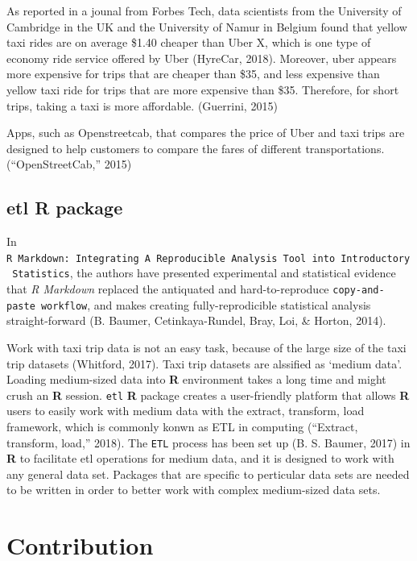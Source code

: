 \documentclass[12pt,twoside]{reedthesis}
\theoremstyle{definition}
\theoremstyle{definition}
\theoremstyle{definition}
\theoremstyle{remark}
\begin{document}
As reported in a jounal from Forbes Tech, data scientists from the
University of Cambridge in the UK and the University of Namur in Belgium
found that yellow taxi rides are on average \$1.40 cheaper than Uber X,
which is one type of economy ride service offered by Uber (HyreCar,
2018). Moreover, uber appears more expensive for trips that are cheaper
than \$35, and less expensive than yellow taxi ride for trips that are
more expensive than \$35. Therefore, for short trips, taking a taxi is
more affordable. (Guerrini, 2015)

Apps, such as Openstreetcab, that compares the price of Uber and taxi
trips are designed to help customers to compare the fares of different
transportations. (``OpenStreetCab,'' 2015)

\subsection{etl R package}\label{etl-r-package}

In
\texttt{R\ Markdown:\ Integrating\ A\ Reproducible\ Analysis\ Tool\ into\ Introductory\ Statistics},
the authors have presented experimental and statistical evidence that
\emph{R Markdown} replaced the antiquated and hard-to-reproduce
\texttt{copy-and-paste\ workflow}, and makes creating fully-reprodicible
statistical analysis straight-forward (B. Baumer, Cetinkaya-Rundel,
Bray, Loi, \& Horton, 2014).

Work with taxi trip data is not an easy task, because of the large size
of the taxi trip datasets (Whitford, 2017). Taxi trip datasets are
alssified as `medium data'. Loading medium-sized data into \textbf{R}
environment takes a long time and might crush an \textbf{R} session.
\texttt{etl} \textbf{R} package creates a user-friendly platform that
allows \textbf{R} users to easily work with medium data with the
extract, transform, load framework, which is commonly konwn as ETL in
computing (``Extract, transform, load,'' 2018). The \texttt{ETL} process
has been set up (B. S. Baumer, 2017) in \textbf{R} to facilitate etl
operations for medium data, and it is designed to work with any general
data set. Packages that are specific to perticular data sets are needed
to be written in order to better work with complex medium-sized data
sets.

\section{Contribution}\label{contribution}
\end{document}
